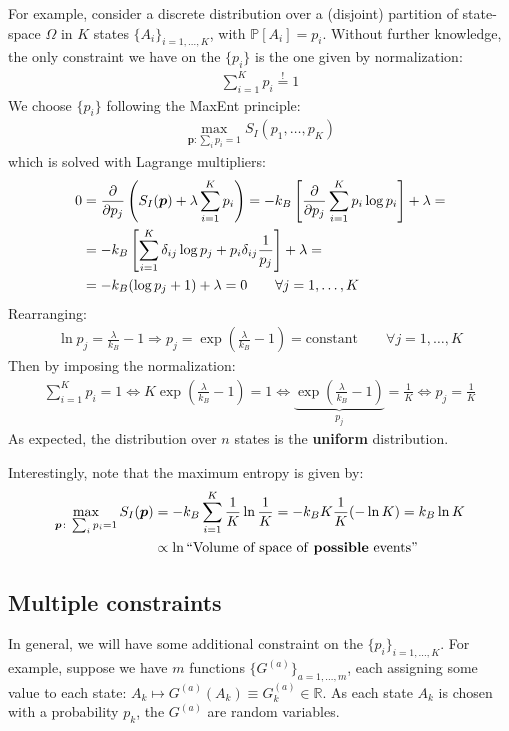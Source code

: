 \documentclass[../../main.tex]{subfiles}
\begin{document}
For example, consider a discrete distribution over a (disjoint) partition of state-space $\Omega$ in $K$ states $\{A_i\}_{i=1,\dots,K}$, with $\mathbb{P}[A_i] = p_i$. Without further knowledge, the only constraint we have on the $\{p_i\}$ is the one given by normalization:
\begin{align*}
    \sum_{i=1}^K p_i \overset{!}{=}  1
\end{align*}
We choose $\{p_i\}$ following the MaxEnt principle:
\begin{align*}
    \max_{\bm{p} \colon \sum_i p_i = 1} S_I(p_1, \dots, p_K)
\end{align*}
which is solved with Lagrange multipliers:
\begin{align*}
    0 &= \pdv{p_j} \left(S_I(\bm{p}) + \lambda \sum_{i=1}^K p_i\right) = -k_B \left[\pdv{p_j} \sum_{i=1}^K p_i \log p_i \right] + \lambda=\\
    &= -k_B \left[\sum_{i=1}^K \delta_{ij} \log p_j + p_i \delta_{ij} \frac{1}{p_j} \right] + \lambda =\\
    &= -k_B(\log p_j + 1) + \lambda = 0 \qquad \forall j=1,\dots,K
\end{align*}
Rearranging:
\begin{align*}
    \ln p_j = \frac{\lambda}{k_B} - 1 \Rightarrow p_j = \exp\left(\frac{\lambda}{k_B} -1 \right)  = \text{constant}  \qquad \forall j=1,\dots,K
\end{align*}
Then by imposing the normalization:
\begin{align*}
    \sum_{i=1}^K p_i = 1 \Leftrightarrow 
    K \exp\left(\frac{\lambda}{k_B} - 1 \right) = 1 \Leftrightarrow \underbrace{\exp\left(\frac{\lambda}{k_B} - 1 \right) }_{p_j} = \frac{1}{K} \Leftrightarrow p_j = \frac{1}{K}  
\end{align*}
As expected, the  distribution over $n$ states is the \textbf{uniform} distribution. 

\medskip

Interestingly, note that the maximum entropy is given by:
\begin{align*}
    \max_{\bm{p} \colon \sum_i p_i = 1} S_I(\bm{p}) &= -k_B \sum_{i=1}^K \frac{1}{K} \ln \frac{1}{K} = -k_B K \frac{1}{K} (-\ln K) = k_B \ln K \\
    &\propto \ln \text{``Volume of space of \textbf{possible} events''}
\end{align*}

\subsection{Multiple constraints}
In general, we will have some additional constraint on the $\{p_i\}_{i=1,\dots,K}$. For example, suppose we have $m$ functions $\{G^{(a)}\}_{a=1,\dots,m}$, each assigning some value to each state: $A_k \mapsto G^{(a)}(A_k) \equiv G_k^{(a)} \in \mathbb{R}$. As each state $A_k$ is chosen with a probability $p_k$, the $G^{(a)}$ are random variables.
\end{document}
